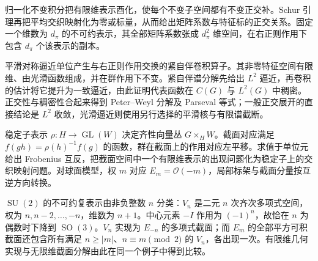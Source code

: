 \begin{chaptersummary}
	归一化不变积分把有限维表示酉化，使每个不变子空间都有不变正交补。Schur 引理再把平均交织映射化为零或标量，从而给出矩阵系数与特征标的正交关系。固定一个维数为 \(d_\pi\) 的不可约表示，其全部矩阵系数张成 \(d_\pi^2\) 维空间，在右正则作用下包含 \(d_\pi\) 个该表示的副本。

	\ProseParagraphBreak

	平滑对称逼近单位产生与右正则作用交换的紧自伴卷积算子。其非零特征空间有限维、由光滑函数组成，并在群作用下不变。紧自伴谱分解先给出 \(L^2\) 逼近，再卷积的估计将它提升为一致逼近，由此证明代表函数在 \(C(G)\) 与 \(L^2(G)\) 中稠密。正交性与稠密性合起来得到 Peter--Weyl 分解及 Parseval 等式；一般正交展开的直接结论是 \(L^2\) 收敛，光滑逼近则使用另行选择的平滑核与有限谱截断。

	\ProseParagraphBreak

	稳定子表示 \(\rho:H\to\operatorname{GL}(W)\) 决定齐性向量丛 \(G\times_H W\)。截面对应满足 \(f(gh)=\rho(h)^{-1}f(g)\) 的函数，群在截面上的作用对应左平移。求值于单位元给出 Frobenius 互反，把截面空间中一个有限维表示的出现问题化为稳定子上的交织映射问题。对球面模型，权 \(m\) 对应 \(E_m=\mathcal O(-m)\)，局部标架与截面分量按互逆方向转换。

	\ProseParagraphBreak

	\(\operatorname{SU}(2)\) 的不可约复表示由非负整数 \(n\) 分类：\(V_n\) 是二元 \(n\) 次齐次多项式空间，权为 \(n,n-2,\ldots,-n\)，维数为 \(n+1\)。中心元素 \(-I\) 作用为 \((-1)^n\)，故恰在 \(n\) 为偶数时下降到 \(\operatorname{SO}(3)\)。\(V_n\) 实现为 \(E_{-n}\) 的多项式截面；而 \(E_m\) 的全部平方可积截面还包含所有满足 \(n\ge|m|\)、\(n\equiv m\pmod2\) 的 \(V_n\)，各出现一次。有限维几何实现与无限维截面分解由此在同一个例子中得到比较。
\end{chaptersummary}

\BookExercises

